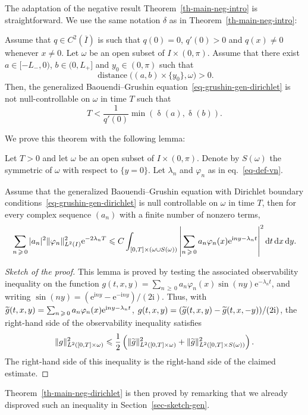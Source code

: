 \documentclass[AHL,Unicode,longabstracts,published]{cedram}
\renewcommand{\leq}{\leqslant}
\renewcommand{\geq}{\geqslant}
\newcommand{\1}{\mathds 1}
\DeclareMathOperator{\distance}{distance}
\DeclareMathOperator{\dagmontilde}{\delta}
\newcommand{\diff}[1][-3]{\ensuremath{\mathop{}\mkern#1mu\mathrm{d}}}
\newcommand{\eu}{\mathrm e}
\newcommand{\iu}{\mathrm i}
\renewcommand{\d}{\delta}
\renewcommand{\l}{\lambda}
\newcommand{\f}{\varphi}
\renewcommand{\o}{\omega}
\let\oldtilde\tilde
\renewcommand*{\tilde}[1]{\mathchoice{\widetilde{#1}}{\widetilde{#1}}{\oldtilde{#1}}{\oldtilde{#1}}}
\renewcommand{\o}{\omega}
\begin{document}
The adaptation of the negative result Theorem~\ref{th-main-neg-intro} is straightforward. We use the same notation $\d$ as in Theorem~\ref{th-main-neg-intro}:

\begin{theo}\label{th-main-neg-dirichlet}
Assume that $q\in C^2(\overline I)$ is such that $q(0) = 0$, $q'(0) > 0$ and $q(x) \neq 0$ whenever $x\neq 0$. Let $\o$ be an open subset of $I\times (0,\pi)$. Assume that there exist $a \in [-L_-,0)$, $b \in (0,L_+]$ and $y_0 \in (0,\pi)$ such that
\[
\distance\big((a,b)\times \{y_0\}, \o\big) > 0.
\]
Then, the generalized Baouendi--Grushin equation~\eqref{eq-grushin-gen-dirichlet} is not null-controllable on $\o$ in time $T$ such that
\[
T< \frac{1}{q'(0)}\min \left(\dagmontilde(a),\dagmontilde(b) \right).
\]
\end{theo}

We prove this theorem with the following lemma:
\begin{lemm}
Let $T>0$ and let $\omega$ be an open subset of $I\times (0,\pi)$. Denote by $S(\omega)$ the symmetric of $\omega$ with respect to $\{y = 0\}$. Let $\l_n$ and $\f_n$ as in eq.~\eqref{eq-def-vn}.

Assume that the generalized Baouendi--Grushin equation with Dirichlet boundary conditions~\eqref{eq-grushin-gen-dirichlet} is null controllable on $\omega$ in time $T$, then for every complex sequence $(a_n)$ with a finite number of nonzero terms,
\[
\sum_{n\,\geq\,0} |a_n|^2 \|\f_n\|^2_{L^2(I)}\eu^{-2\l_n T} \leq C \int_{[0,T]\times (\o \cup S(\o))} \left|\sum_{n\,\geq\,0} a_n \f_n(x) \eu^{\iu n y - \l_n t}\right|^2 \diff t \diff x \diff y.
\]
\end{lemm}

\begin{proof}[Sketch of the proof]
This lemma is proved by testing the associated observability inequality on the function $g(t,x,y) = \sum_{n\,\geq\,0} a_n \f_n(x)\sin(ny) \eu^{-\l_n t}$, and writing $\sin(ny) = (\eu^{\iu ny} - \eu^{-\iu ny})/(2\iu)$. Thus, with $\tilde g(t,x,y) = \sum_{n\,\geq\,0} a_n \f_n(x)\eu^{\iu n y - \l_n t}$, $g(t,x,y) = (\tilde g(t,x,y) - \tilde g(t,x,-y))/(2\iu)$, the right-hand side of the observability inequality satisfies
\[
\|g\|_{L^2([0,T]\times \o)}^2 \leq \dfrac12 \left(\|\tilde g\|_{L^2([0,T]\times \o)}^2 + \|\tilde g\|^2_{L^2([0,T]\times S(\o))}\right).
\]
The right-hand side of this inequality is the right-hand side of the claimed estimate.
\end{proof}

Theorem~\ref{th-main-neg-dirichlet} is then proved by remarking that we already disproved such an inequality in Section~\ref{sec-sketch-gen}.
\end{document}
